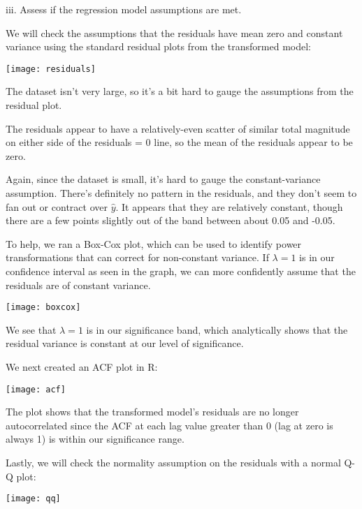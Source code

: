\documentclass{article}
\begin{document}
\begin{flushleft}
iii. Assess if the regression model assumptions are met.\newline

We will check the assumptions that the residuals have mean zero and constant variance using the standard residual plots from the transformed model:

\begin{center}
\texttt{[image: residuals]}
\end{center}

The dataset isn't very large, so it's a bit hard to gauge the assumptions from the residual plot.\newline

The residuals appear to have a relatively-even scatter of similar total magnitude on either side of the residuals = 0 line, so the mean of the residuals appear to be zero. \newline

Again, since the dataset is small, it's hard to gauge the constant-variance assumption. There's definitely no pattern in the residuals, and they don't seem to fan out or contract over $\hat{y}$. It appears that they are relatively constant, though there are a few points slightly out of the band between about 0.05 and -0.05.\newline

To help, we ran a Box-Cox plot, which can be used to identify power transformations that can correct for non-constant variance. If $\lambda=1$ is in our confidence interval as seen in the graph, we can more confidently assume that the residuals are of constant variance. 
\begin{center}
\texttt{[image: boxcox]}
\end{center}

We see that $\lambda=1$ is in our significance band, which analytically shows that the residual variance is constant at our level of significance. \newline

We next created an ACF plot in R:
\begin{center}
\texttt{[image: acf]}
\end{center}

The plot shows that the transformed model's residuals are no longer autocorrelated since the ACF at each lag value greater than 0 (lag at zero is always 1) is within our significance range. \newline

Lastly, we will check the normality assumption on the residuals with a normal Q-Q plot:
\begin{center}
\texttt{[image: qq]}
\end{center}


\end{flushleft}
\end{document}
